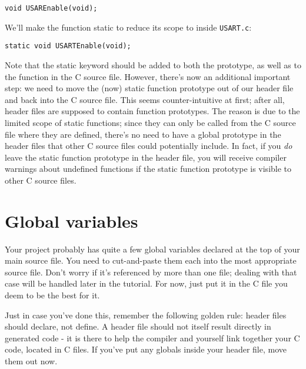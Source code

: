 \documentclass[a4paper,oneside,notitlepage]{article}
\begin{document}
\begin{center}
\begin{lstlisting}
void USAREnable(void);
\end{lstlisting}
\end{center}

We'll make the function static to reduce its scope to inside \texttt{USART.c}:

\begin{center}
\begin{lstlisting}
static void USARTEnable(void);
\end{lstlisting}
\end{center}

Note that the static keyword should be added to both the prototype, as well as to the function in the C source file. However, there's now an additional important step: we need to move the (now) static function prototype out of our header file and back into the C source file. This seems counter-intuitive at first; after all, header files are supposed to contain function prototypes. The reason is due to the limited scope of static functions; since they can only be called from the C source file where they are defined, there's no need to have a global prototype in the header files that other C source files could potentially include. In fact, if you \textit{do} leave the static function prototype in the header file, you will receive compiler warnings about undefined functions if the static function prototype is visible to other C source files.

\section{Global variables}

Your project probably has quite a few global variables declared at the top of your main source file. You need to cut-and-paste them each into the most appropriate source file. Don't worry if it's referenced by more than one file; dealing with that case will be handled later in the tutorial. For now, just put it in the C file you deem to be the best for it.

Just in case you've done this, remember the following golden rule: header files should declare, not define. A header file should not itself result directly in generated code - it is there to help the compiler and yourself link together your C code, located in C files. If you've put any globals inside your header file, move them out now.
\end{document}
